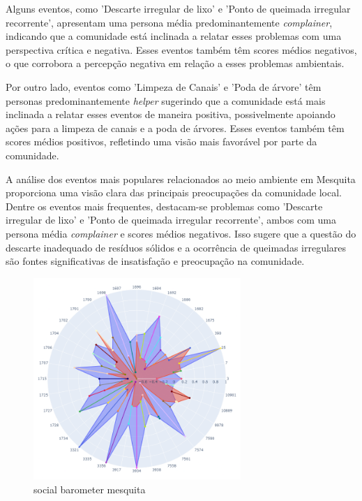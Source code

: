 Alguns eventos, como 'Descarte irregular de lixo' e 'Ponto de queimada irregular recorrente', apresentam uma persona média predominantemente \textit{complainer}, indicando que a comunidade está inclinada a relatar esses problemas com uma perspectiva crítica e negativa. Esses eventos também têm scores médios negativos, o que corrobora a percepção negativa em relação a esses problemas ambientais.

Por outro lado, eventos como 'Limpeza de Canais' e 'Poda de árvore' têm personas predominantemente \textit{helper} sugerindo que a comunidade está mais inclinada a relatar esses eventos de maneira positiva, possivelmente apoiando ações para a limpeza de canais e a poda de árvores. Esses eventos também têm scores médios positivos, refletindo uma visão mais favorável por parte da comunidade.

A análise dos eventos mais populares relacionados ao meio ambiente em Mesquita proporciona uma visão clara das principais preocupações da comunidade local. Dentre os eventos mais frequentes, destacam-se problemas como 'Descarte irregular de lixo' e 'Ponto de queimada irregular recorrente', ambos com uma persona média \textit{complainer} e scores médios negativos. Isso sugere que a questão do descarte inadequado de resíduos sólidos e a ocorrência de queimadas irregulares são fontes significativas de insatisfação e preocupação na comunidade.

\begin{figure}[htb]
	\centering
	\includegraphics[width=0.7\textwidth]{images/social_barometer_mesquita.png}
	\caption{social barometer mesquita}
	\label{fig:social_barometer_mesquita}
\end{figure}

